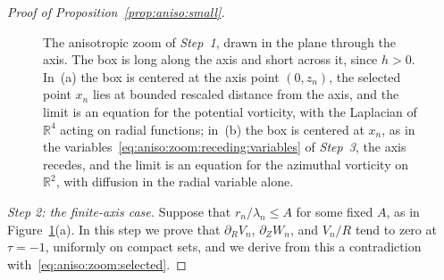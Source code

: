 \documentclass[11pt,reqno]{amsproc}
\numberwithin{equation}{section}
\theoremstyle{remark}
\newcommand{\p}{\partial}
\newcommand{\RR}{\mathbb R}
\begin{document}
\begin{proof}[Proof of Proposition~\ref{prop:aniso:small}]
\begin{figure}[!htb]
\vspace{0.15cm}
\caption{\footnotesize The anisotropic zoom of \emph{Step~1}, drawn in the plane through the axis. The box is long along the axis and short across it, since $h>0$. In~(a) the box is centered at the axis point $(0,z_n)$, the selected point $x_n$ lies at bounded rescaled distance from the axis, and the limit is an equation for the potential vorticity, with the Laplacian of $\RR^4$ acting on radial functions; in~(b) the box is centered at $x_n$, as in the variables~\eqref{eq:aniso:zoom:receding:variables} of \emph{Step~3}, the axis recedes, and the limit is an equation for the azimuthal vorticity on $\RR^2$, with diffusion in the radial variable alone.}
\label{fig:aniso:zoom}
\end{figure}

\emph{Step 2: the finite-axis case.}
Suppose that $r_n/\lambda_n\le A$ for some fixed $A$, as in Figure~\ref{fig:aniso:zoom}(a). In this step we prove that $\p_RV_n$, $\p_ZW_n$, and $V_n/R$ tend to zero at $\tau=-1$, uniformly on compact sets, and we derive from this a contradiction with~\eqref{eq:aniso:zoom:selected}.


\end{proof}
\end{document}
